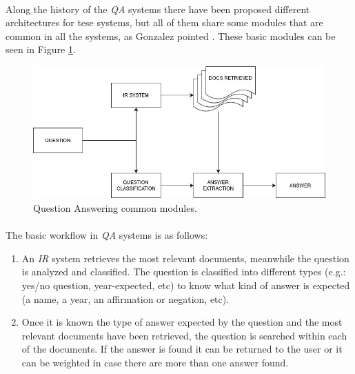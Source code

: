 \paragraph{}
Along the history of the \emph{QA} systems there have been proposed different architectures for tese systems, but all of them share some modules that are common in all the systems, as Gonzalez pointed \cite{Gonzalez2003}. These basic modules can be seen in Figure \ref{fig:qa-modules}.
\begin{figure}[!h]
	\centering
	\includegraphics[scale=0.35]{images/qamodules}
	\caption{Question Answering common modules.}
	\label{fig:qa-modules}
\end{figure}
\paragraph{}
The basic workflow in \emph{QA} systems is as follows: 
\begin{enumerate}
\item An \emph{IR} system retrieves the most relevant documents, meanwhile the question is analyzed and classified. The question is classified into different types (e.g.: yes/no question, year-expected, etc) to know what kind of answer is expected (a name, a year, an affirmation or negation, etc).
\item Once it is known the type of answer expected by the question and the most relevant documents have been retrieved, the question is searched within each of the documents. If the answer is found it can be returned to the user or it can be weighted in case there are more than one answer found.
\end{enumerate} 
